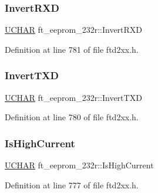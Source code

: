 \subsubsection{\texorpdfstring{Invert\+R\+XD}{InvertRXD}}
{\footnotesize\ttfamily \hyperlink{CatCaloProto40MHz_2inc_2WinTypes_8h_a4f4bb67531a9bf6f0b9c6ad76aeba587}{U\+C\+H\+AR} ft\+\_\+eeprom\+\_\+232r\+::\+Invert\+R\+XD}



Definition at line 781 of file ftd2xx.\+h.

\mbox{\label{structft__eeprom__232r_ae284d5a2e53c8e77dcbdd7789734b8f0}} 
\subsubsection{\texorpdfstring{Invert\+T\+XD}{InvertTXD}}
{\footnotesize\ttfamily \hyperlink{CatCaloProto40MHz_2inc_2WinTypes_8h_a4f4bb67531a9bf6f0b9c6ad76aeba587}{U\+C\+H\+AR} ft\+\_\+eeprom\+\_\+232r\+::\+Invert\+T\+XD}



Definition at line 780 of file ftd2xx.\+h.

\mbox{\label{structft__eeprom__232r_abd8a4afecd3fa431c7654d14886395dd}} 
\subsubsection{\texorpdfstring{Is\+High\+Current}{IsHighCurrent}}
{\footnotesize\ttfamily \hyperlink{CatCaloProto40MHz_2inc_2WinTypes_8h_a4f4bb67531a9bf6f0b9c6ad76aeba587}{U\+C\+H\+AR} ft\+\_\+eeprom\+\_\+232r\+::\+Is\+High\+Current}



Definition at line 777 of file ftd2xx.\+h.

\mbox{\label{structft__eeprom__232r_af430c36e3ca675a6860463b70b963369}} 
